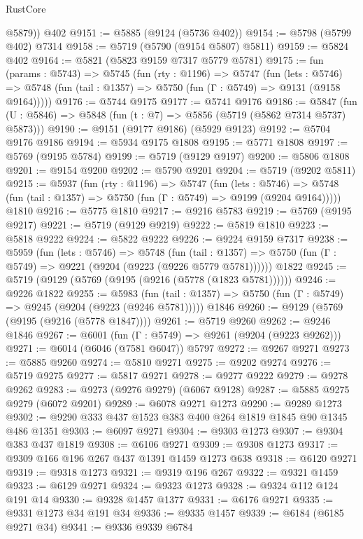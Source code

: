 \begin{lexlean}{RustCore}
\begin{coremodule}
        @5879))
    @402
@9151 := @5885 (@9124 (@5736 @402))
@9154 := @5798 (@5799 @402) @7314
@9158 := @5719 (@5790 (@9154 @5807) @5811)
@9159 := @5824 @402
@9164 := @5821 (@5823 @9159 @7317 @5779 @5781)
@9175 := fun (params : @5743) =>
  @5745
    (fun (rty : @1196) =>
    @5747
      (fun (lets : @5746) =>
      @5748 (fun (tail : @1357) => @5750 (fun (Γ : @5749) => @9131 (@9158 @9164)))))
@9176 := @5744 @9175
@9177 := @5741 @9176
@9186 := @5847 (fun (U : @5846) => @5848 (fun (t : @7) => @5856 (@5719 (@5862 @7314 @5737) @5873)))
@9190 := @9151 (@9177 @9186) (@5929 @9123)
@9192 := @5704 @9176 @9186
@9194 := @5934 @9175 @1808
@9195 := @5771 @1808
@9197 := @5769 (@9195 @5784)
@9199 := @5719 (@9129 @9197)
@9200 := @5806 @1808
@9201 := @9154 @9200
@9202 := @5790 @9201
@9204 := @5719 (@9202 @5811)
@9215 := @5937
    (fun (rty : @1196) =>
    @5747
      (fun (lets : @5746) =>
      @5748 (fun (tail : @1357) => @5750 (fun (Γ : @5749) => @9199 (@9204 @9164)))))
    @1810
@9216 := @5775 @1810
@9217 := @9216 @5783
@9219 := @5769 (@9195 @9217)
@9221 := @5719 (@9129 @9219)
@9222 := @5819 @1810
@9223 := @5818 @9222
@9224 := @5822 @9222
@9226 := @9224 @9159 @7317
@9238 := @5959
    (fun (lets : @5746) =>
    @5748
      (fun (tail : @1357) => @5750 (fun (Γ : @5749) => @9221 (@9204 (@9223 (@9226 @5779 @5781))))))
    @1822
@9245 := @5719 (@9129 (@5769 (@9195 (@9216 (@5778 (@1823 @5781))))))
@9246 := @9226 @1822
@9255 := @5983
    (fun (tail : @1357) => @5750 (fun (Γ : @5749) => @9245 (@9204 (@9223 (@9246 @5781)))))
    @1846
@9260 := @9129 (@5769 (@9195 (@9216 (@5778 @1847))))
@9261 := @5719 @9260
@9262 := @9246 @1846
@9267 := @6001 (fun (Γ : @5749) => @9261 (@9204 (@9223 @9262)))
@9271 := @6014 (@6046 (@7581 @6047)) @5797
@9272 := @9267 @9271
@9273 := @5885 @9260
@9274 := @5810 @9271
@9275 := @9202 @9274
@9276 := @5719 @9275
@9277 := @5817 @9271
@9278 := @9277 @9222
@9279 := @9278 @9262
@9283 := @9273 (@9276 @9279) (@6067 @9128)
@9287 := @5885 @9275 @9279 (@6072 @9201)
@9289 := @6078 @9271 @1273
@9290 := @9289 @1273
@9302 := @9290 @333 @437 @1523 @383 @400 @264 @1819 @1845 @90 @1345 @486 @1351
@9303 := @6097 @9271
@9304 := @9303 @1273
@9307 := @9304 @383 @437 @1819
@9308 := @6106 @9271
@9309 := @9308 @1273
@9317 := @9309 @166 @196 @267 @437 @1391 @1459 @1273 @638
@9318 := @6120 @9271
@9319 := @9318 @1273
@9321 := @9319 @196 @267
@9322 := @9321 @1459
@9323 := @6129 @9271
@9324 := @9323 @1273
@9328 := @9324 @112 @124 @191 @14
@9330 := @9328 @1457 @1377
@9331 := @6176 @9271
@9335 := @9331 @1273 @34 @191 @34
@9336 := @9335 @1457
@9339 := @6184 (@6185 @9271 @34)
@9341 := @9336 @9339 @6784

\end{coremodule}
\end{lexlean}
